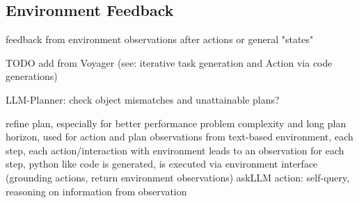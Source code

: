 \documentclass{article}
\begin{document}
\subsection{Environment Feedback}
feedback from environment
observations after actions or general "states"

TODO add from Voyager \cite{wang_voyager_2023} (see: iterative task generation and Action via code generations)

LLM-Planner: check object mismatches and unattainable plans? \cite{song_llm-planner_2023}


\cite{sun_adaplanner_2023-1} refine plan, especially for better performance problem complexity and long plan horizon, used for action and plan
observations from text-based environment, each step, each action/interaction with environment leads to an observation
for each step, python like code is generated, is executed via environment interface (grounding actions, return environment observations)
askLLM action: self-query, reasoning on information from observation
\end{document}
